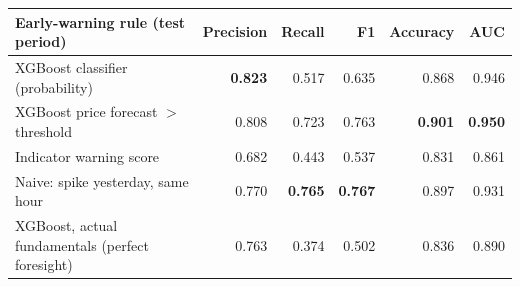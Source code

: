 \begin{tabular}{lrrrrr}
\toprule
Early-warning rule (test period) & Precision & Recall & F1 & Accuracy & AUC \\
\midrule
XGBoost classifier (probability) & \textbf{0.823} & 0.517 & 0.635 & 0.868 & 0.946 \\
XGBoost price forecast $>$ threshold & 0.808 & 0.723 & 0.763 & \textbf{0.901} & \textbf{0.950} \\
Indicator warning score & 0.682 & 0.443 & 0.537 & 0.831 & 0.861 \\
Naive: spike yesterday, same hour & 0.770 & \textbf{0.765} & \textbf{0.767} & 0.897 & 0.931 \\
XGBoost, actual fundamentals (perfect foresight) & 0.763 & 0.374 & 0.502 & 0.836 & 0.890 \\
\bottomrule
\end{tabular}
